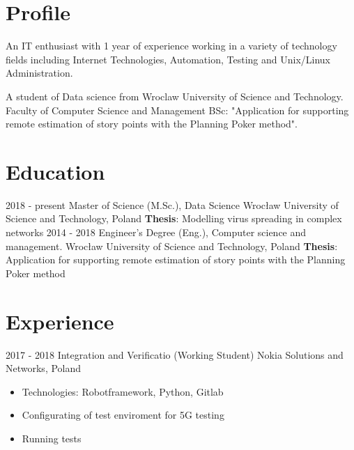 \documentclass[letterpaper]{tenseconds} %
\begin{document}
\makeprofile %

\section{Profile}
\textnormal{\faInfo} An IT enthusiast with 1 year of experience working in a variety of technology fields including Internet Technologies, Automation, Testing and Unix/Linux Administration.

\textnormal{\faGraduationCap} A student of Data science from Wroclaw University of Science and Technology. Faculty of Computer Science and Management BSc: "Application for supporting remote estimation of
story points with the Planning Poker method". \vspace{2mm}

\section{Education}
\begin{twenty} %
	\twentyitem
	{2018 - present}
	{}
	{Master of Science (M.Sc.), Data Science}
	{Wrocław University of Science and Technology, Poland \href{https://pwr.edu.pl/}{\faExternalLink}}
	{
		\textbf{Thesis}: Modelling virus spreading in complex networks
	}
	{}
	{}
	\twentyitem
	{2014 - 2018}
	{}
	{Engineer's Degree (Eng.), Computer science and management.}
	{Wrocław University of Science and Technology, Poland \href{https://pwr.edu.pl/}{\faExternalLink}}
	{}
	{
		\textbf{Thesis}:  Application for supporting remote estimation of story points with the Planning Poker method
	}
	{}
	{}
\end{twenty}

\section{Experience}
\begin{twenty} %
	\twentyitem
	{2017 - 2018}
	{}
	{Integration and Verificatio \textnormal{(Working Student)}}
	{Nokia Solutions and Networks, Poland \href{https://nokiawroclaw.pl/}{\faExternalLink}}
	{}
	{\begin{itemize}
			\item Technologies: Robotframework, Python, Gitlab
			\item Configurating of test enviroment for 5G testing
			\item Running tests
		\end{itemize}}
\end{twenty}
\end{document}
